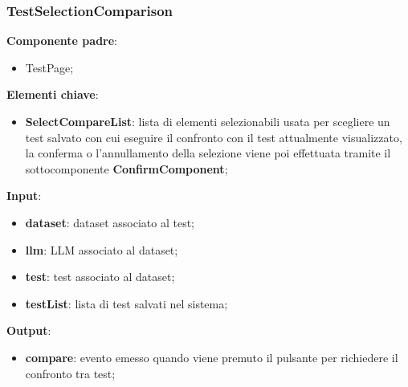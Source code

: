 \subsubsection{TestSelectionComparison}
\textbf{Componente padre}:
\begin{itemize}
    \item TestPage;
\end{itemize}
\textbf{Elementi chiave}:
\begin{itemize}
    \item \textbf{SelectCompareList}: lista di elementi selezionabili usata per scegliere un test salvato con cui eseguire il confronto con il test attualmente visualizzato, la conferma o l'annullamento della selezione viene poi effettuata tramite il sottocomponente \textbf{ConfirmComponent};
\end{itemize}
    \textbf{Input}:
\begin{itemize}
    \item \textbf{dataset}: dataset associato al test;
    \item \textbf{llm}: LLM associato al dataset;
    \item \textbf{test}: test associato al dataset;
    \item \textbf{testList}: lista di test salvati nel sistema;
\end{itemize}
\textbf{Output}:
\begin{itemize}
    \item \textbf{compare}: evento emesso quando viene premuto il pulsante per richiedere il confronto tra test;
\end{itemize}
